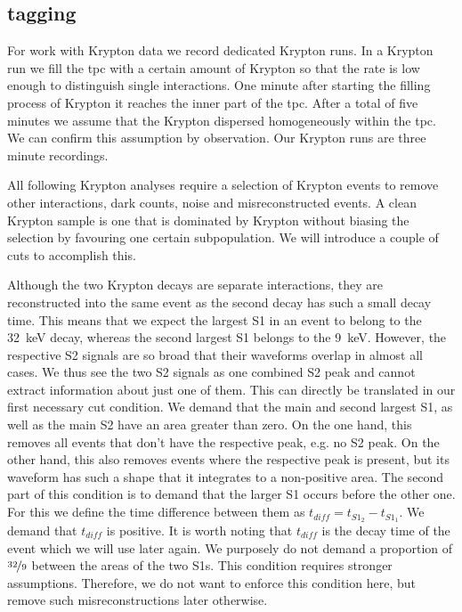 
\FloatBarrier
\subsection{tagging}
\label{ssec:tagging}
\FloatBarrier


For work with Krypton data we record dedicated Krypton runs.
In a Krypton run we fill the \gls{tpc} with a certain amount of Krypton so that the rate is low enough to distinguish single interactions.
One minute after starting the filling process of Krypton it reaches the inner part of the \gls{tpc}.
After a total of five minutes we assume that the Krypton dispersed homogeneously within the \gls{tpc}.
We can confirm this assumption by observation.
Our Krypton runs are three minute recordings.


All following Krypton analyses require a selection of Krypton events to remove other interactions, dark counts, noise and misreconstructed events.
A clean Krypton sample is one that is dominated by Krypton without biasing the selection by favouring one certain subpopulation.
We will introduce a couple of cuts to accomplish this.


Although the two Krypton decays are separate interactions, they are reconstructed into the same event as the second decay has such a small decay time.
This means that we expect the largest S1 in an event to belong to the \SI{32}{\kilo\eV} decay, whereas the second largest S1 belongs to the \SI{9}{\kilo\eV}.
However, the respective S2 signals are so broad that their waveforms overlap in almost all cases.
We thus see the two S2 signals as one combined S2 peak and cannot extract information about just one of them.
This can directly be translated in our first necessary cut condition.
We demand that the main and second largest S1, as well as the main S2 have an area greater than zero.
On the one hand, this removes all events that don't have the respective peak, e.g. no S2 peak.
On the other hand, this also removes events where the respective peak is present, but its waveform has such a shape that it integrates to a non-positive area.
The second part of this condition is to demand that the larger S1 occurs before the other one.
For this we define the time difference between them as $t_{diff} = t_{S1_2} - t_{S1_1}$.
We demand that $t_{diff}$ is positive.
It is worth noting that $t_{diff}$ is the decay time of the event which we will use later again.
We purposely do not demand a proportion of $ \nicefrac{32}{9} $ between the areas of the two S1s.
This condition requires stronger assumptions.
Therefore, we do not want to enforce this condition here, but remove such misreconstructions later otherwise.


